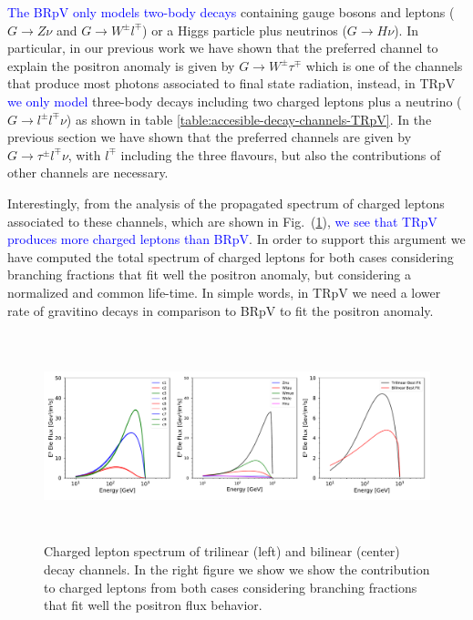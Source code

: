\documentclass[a4paper,11pt]{article}
\newcommand*{\blue}{\textcolor{blue}}
\begin{document}
\blue{The BRpV only models two-body decays} containing gauge bosons and leptons ($G\rightarrow Z \nu$ and $G\rightarrow W^{\pm} l^{\mp}$) or a Higgs particle plus neutrinos ($G\rightarrow H\nu$). In particular, in our previous work we have shown that the preferred channel to explain the positron anomaly is given by $G\rightarrow W^{\pm} \tau^{\mp}$ which is one of the channels that produce most photons associated to final state radiation, instead, in TRpV \blue{we only model} three-body decays including two charged leptons plus a neutrino ($G\rightarrow l^{\pm} l^{\mp} \nu$) as shown in table \ref{table:accesible-decay-channels-TRpV}. In the previous section we have shown that the preferred channels are given by $G\rightarrow \tau^{\pm} l^{\mp} \nu$, with $l^{\mp}$ including the three flavours, but also the contributions of other channels are necessary.   

Interestingly, from the analysis of the propagated spectrum of charged leptons associated to these channels, which are shown in Fig.~(\ref{fig:positron-spectrum}), \blue{we see that TRpV produces more charged leptons than BRpV}. In order to support this argument we have computed the total spectrum of charged leptons for both cases considering branching fractions that fit well the positron anomaly, but considering a normalized and common life-time. In simple words, in TRpV we need a lower rate of gravitino decays in comparison to BRpV to fit the positron anomaly.


\begin{figure}[htb]
\begin{center}
\includegraphics[height=6cm,width=16cm,angle=0]{Figures/exp_plots_electron_flux_comparison.pdf}
\caption{Charged lepton spectrum of trilinear (left) and bilinear (center) decay channels. In the right figure we show we show the contribution to charged leptons from both cases considering branching fractions that fit well the positron flux behavior.}
\label{fig:positron-spectrum}
\end{center}
\end{figure}
\end{document}
